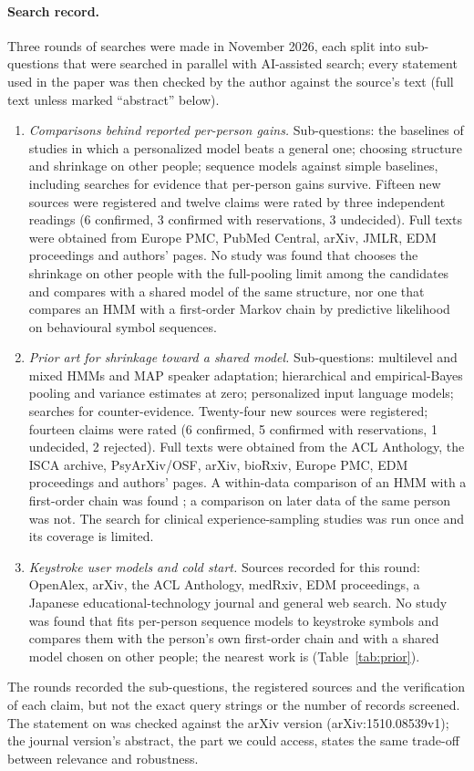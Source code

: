 \documentclass[10pt]{article}
\begin{document}
\paragraph{Search record.} Three rounds of searches were made in November 2026, each split into sub-questions that were searched in parallel with AI-assisted search; every statement used in the paper was then checked by the author against the source's text (full text unless marked ``abstract'' below).
\begin{enumerate}
\item \emph{Comparisons behind reported per-person gains.} Sub-questions: the baselines of studies in which a personalized model beats a general one; choosing structure and shrinkage on other people; sequence models against simple baselines, including searches for evidence that per-person gains survive. Fifteen new sources were registered and twelve claims were rated by three independent readings (6 confirmed, 3 confirmed with reservations, 3 undecided). Full texts were obtained from Europe PMC, PubMed Central, arXiv, JMLR, EDM proceedings and authors' pages. No study was found that chooses the shrinkage on other people with the full-pooling limit among the candidates and compares with a shared model of the same structure, nor one that compares an HMM with a first-order Markov chain by predictive likelihood on behavioural symbol sequences.
\item \emph{Prior art for shrinkage toward a shared model.} Sub-questions: multilevel and mixed HMMs and MAP speaker adaptation; hierarchical and empirical-Bayes pooling and variance estimates at zero; personalized input language models; searches for counter-evidence. Twenty-four new sources were registered; fourteen claims were rated (6 confirmed, 5 confirmed with reservations, 1 undecided, 2 rejected). Full texts were obtained from the ACL Anthology, the ISCA archive, PsyArXiv/OSF, arXiv, bioRxiv, Europe PMC, EDM proceedings and authors' pages. A within-data comparison of an HMM with a first-order chain was found \citep{Shirley2010}; a comparison on later data of the same person was not. The search for clinical experience-sampling studies was run once and its coverage is limited.
\item \emph{Keystroke user models and cold start.} Sources recorded for this round: OpenAlex, arXiv, the ACL Anthology, medRxiv, EDM proceedings, a Japanese educational-technology journal and general web search. No study was found that fits per-person sequence models to keystroke symbols and compares them with the person's own first-order chain and with a shared model chosen on other people; the nearest work is \citet{Uto2020} (Table~\ref{tab:prior}).
\end{enumerate}
The rounds recorded the sub-questions, the registered sources and the verification of each claim, but not the exact query strings or the number of records screened. The statement on \citet{LiuMeng2016} was checked against the arXiv version (arXiv:1510.08539v1); the journal version's abstract, the part we could access, states the same trade-off between relevance and robustness.
\end{document}
